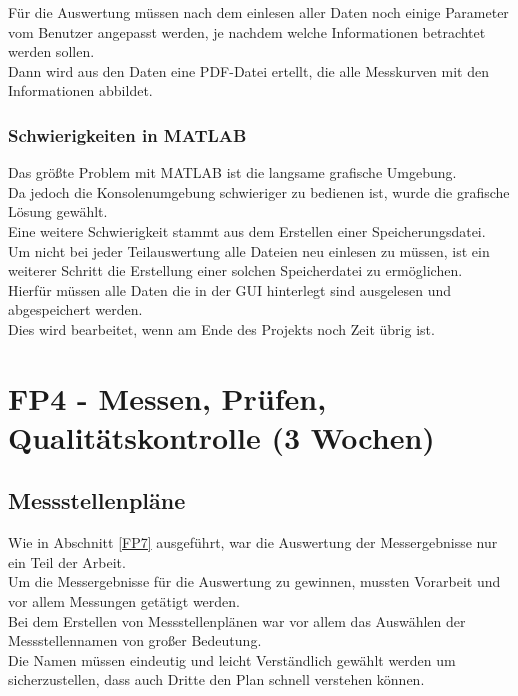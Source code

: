 Für die Auswertung müssen nach dem einlesen aller Daten noch einige Parameter vom Benutzer angepasst werden, je nachdem welche Informationen betrachtet werden sollen.\\
Dann wird aus den Daten eine PDF-Datei ertellt, die alle Messkurven mit den Informationen abbildet. \\

\subsubsection{Schwierigkeiten in MATLAB}

Das größte Problem mit MATLAB ist die langsame grafische Umgebung. \\
Da jedoch die Konsolenumgebung schwieriger zu bedienen ist, wurde die grafische Lösung gewählt.\\

Eine weitere Schwierigkeit stammt aus dem Erstellen einer Speicherungsdatei. Um nicht bei jeder Teilauswertung alle Dateien neu einlesen zu müssen, ist ein weiterer Schritt die Erstellung einer solchen Speicherdatei zu ermöglichen. \\
Hierfür müssen alle Daten die in der GUI hinterlegt sind ausgelesen und abgespeichert werden.\\
Dies wird bearbeitet, wenn am Ende des Projekts noch Zeit übrig ist. \\

\newpage

\section{FP4 - Messen, Prüfen, Qualitätskontrolle (3 Wochen)}

\subsection{Messstellenpläne}

Wie in Abschnitt \ref{FP7} ausgeführt, war die Auswertung der Messergebnisse nur ein Teil der Arbeit. \\
Um die Messergebnisse für die Auswertung zu gewinnen, mussten Vorarbeit und vor allem Messungen getätigt werden.\\

Bei dem Erstellen von Messstellenplänen war vor allem das Auswählen der Messstellennamen von großer Bedeutung. \\
Die Namen müssen eindeutig und leicht Verständlich gewählt werden um sicherzustellen, dass auch Dritte den Plan schnell verstehen können. \\

